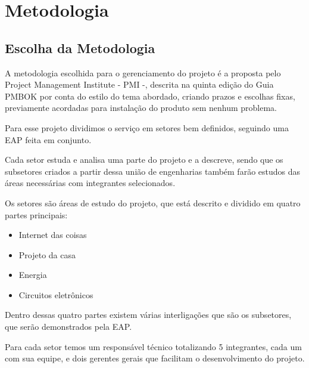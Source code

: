 \chapter{Metodologia}
    \section{Escolha da Metodologia}
        \par A metodologia escolhida para o gerenciamento do projeto é a proposta pelo Project Management Institute - PMI -, descrita na quinta edição do Guia PMBOK por conta do estilo do tema abordado, criando prazos e escolhas fixas, previamente acordadas para instalação do produto sem nenhum problema.
        \par Para esse projeto dividimos o serviço em setores bem definidos, seguindo uma EAP feita em conjunto.
        \par Cada setor estuda e analisa uma parte do projeto e a descreve, sendo que os subsetores criados a partir dessa união de engenharias também farão estudos das áreas necessárias com integrantes selecionados.
        \par Os setores são áreas de estudo do projeto,  que está descrito e dividido em quatro partes principais:
        \begin{itemize}
            \item Internet das coisas
            \item Projeto da casa
            \item Energia
            \item Circuitos eletrônicos
        \end{itemize}
        \par Dentro dessas quatro partes existem várias interligações que são os subsetores, que serão demonstrados pela EAP.
    	\par Para cada setor temos um responsável técnico totalizando 5 integrantes, cada um com sua equipe, e dois gerentes gerais que facilitam o desenvolvimento do projeto.


